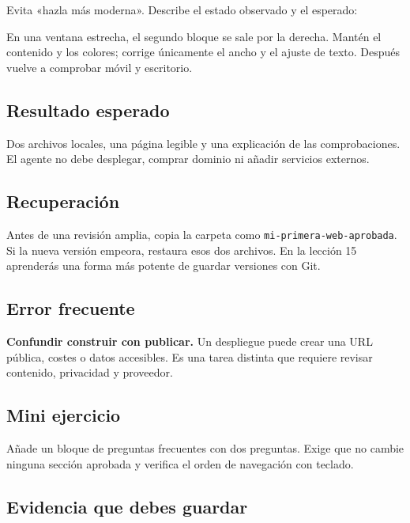 \documentclass[10pt,a4paper,openany]{book}
\newenvironment{Shaded}{}{}
\newcommand{\NormalTok}[1]{#1}
\renewenvironment{Shaded}
  {\begin{tcolorbox}[
    enhanced,
    breakable,
    colback=CodeBg,
    colframe=Border,
    boxrule=0.5pt,
    arc=2mm,
    left=3mm,
    right=3mm,
    top=2.2mm,
    bottom=2.2mm,
    before skip=0.8em,
    after skip=0.9em
  ]}
  {\end{tcolorbox}}
\begin{document}
Evita «hazla más moderna». Describe el estado observado y el esperado:

\begin{Shaded}
\begin{Highlighting}[]
\NormalTok{En una ventana estrecha, el segundo bloque se sale por la derecha. Mantén el}
\NormalTok{contenido y los colores; corrige únicamente el ancho y el ajuste de texto.}
\NormalTok{Después vuelve a comprobar móvil y escritorio.}
\end{Highlighting}
\end{Shaded}

\subsection{Resultado esperado}\label{resultado-esperado-4}

Dos archivos locales, una página legible y una explicación de las
comprobaciones. El agente no debe desplegar, comprar dominio ni añadir
servicios externos.

\subsection{Recuperación}\label{recuperaciuxf3n-8}

Antes de una revisión amplia, copia la carpeta como
\texttt{mi-primera-web-aprobada}. Si la nueva versión empeora, restaura
esos dos archivos. En la lección 15 aprenderás una forma más potente de
guardar versiones con Git.

\subsection{Error frecuente}\label{error-frecuente-10}

\textbf{Confundir construir con publicar.} Un despliegue puede crear una
URL pública, costes o datos accesibles. Es una tarea distinta que
requiere revisar contenido, privacidad y proveedor.

\subsection{Mini ejercicio}\label{mini-ejercicio-6}

Añade un bloque de preguntas frecuentes con dos preguntas. Exige que no
cambie ninguna sección aprobada y verifica el orden de navegación con
teclado.

\subsection{Evidencia que debes
guardar}\label{evidencia-que-debes-guardar-10}
\end{document}
